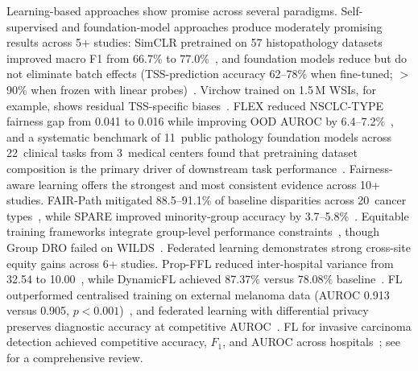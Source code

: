 Learning-based approaches show promise across several paradigms. Self-supervised and foundation-model approaches produce moderately promising results across 5+ studies: SimCLR pretrained
on 57 histopathology datasets improved macro F1 from 66.7\% to
77.0\%~\citep{ciga2023self}, and foundation models reduce but do not
eliminate batch effects (TSS-prediction accuracy 62--78\% when fine-tuned; $>$90\% when frozen with linear probes)~\citep{komen2024batch}.
Virchow trained on 1.5\,M WSIs, for example, shows residual TSS-specific
biases~\citep{vorontsov2024foundation}. FLEX reduced NSCLC-TYPE fairness gap from 0.041 to 0.016 while
improving OOD AUROC by 6.4--7.2\%~\citep{huang2025knowledge}, and a systematic benchmark of
11~public pathology foundation models across 22~clinical tasks from
3~medical centers found that pretraining dataset composition is the
primary driver of downstream task performance~\citep{campanella2025clinical}. Fairness-aware learning offers the strongest and most consistent evidence across 10+ studies. FAIR-Path
mitigated 88.5--91.1\% of baseline disparities across 20~cancer
types~\citep{lin2025contrastive}, while SPARE improved minority-group
accuracy by 3.7--5.8\%~\citep{xu2026spare}. Equitable training
frameworks integrate group-level performance
constraints~\citep{shi2025equitable}, though Group DRO failed on
WILDS~\citep{koh2021wilds}. Federated learning demonstrates strong cross-site equity gains across 6+ studies. Prop-FFL reduced
inter-hospital variance from 32.54 to
10.00~\citep{hosseini2023proportionally}, while DynamicFL achieved 87.37\%
versus 78.08\% baseline~\citep{zhang2025dynamicfl}. FL outperformed
centralised training on external melanoma data (AUROC 0.913 versus
0.905, $p < 0.001$)~\citep{haggenmuller2024federated}, and federated learning with differential privacy preserves diagnostic
accuracy at competitive AUROC~\citep{lu2022federated, adnan2022federated}.
FL for invasive carcinoma detection achieved competitive accuracy,
$F_1$, and AUROC across hospitals~\citep{agbley2022federated}; see~\citep{shukla2025federated} for a comprehensive review.

